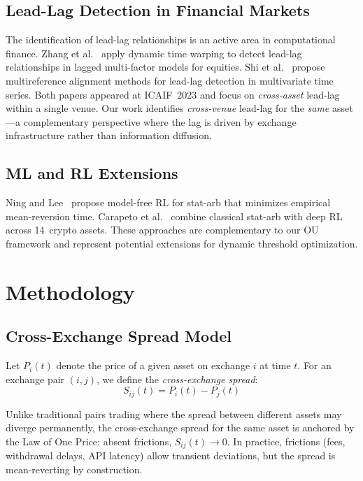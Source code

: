 \documentclass[sigconf,nonacm=false]{acmart}
\begin{document}
\subsection{Lead-Lag Detection in Financial Markets}

The identification of lead-lag relationships is an active area in computational finance. Zhang et al.~\cite{zhang2023dtw} apply dynamic time warping to detect lead-lag relationships in lagged multi-factor models for equities. Shi et al.~\cite{shi2023multireference} propose multireference alignment methods for lead-lag detection in multivariate time series. Both papers appeared at ICAIF~2023 and focus on \emph{cross-asset} lead-lag within a single venue. Our work identifies \emph{cross-venue} lead-lag for the \emph{same} asset---a complementary perspective where the lag is driven by exchange infrastructure rather than information diffusion.

\subsection{ML and RL Extensions}

Ning and Lee~\cite{ning2024advanced} propose model-free RL for stat-arb that minimizes empirical mean-reversion time. Carapeto et al.~\cite{carapeto2024deep} combine classical stat-arb with deep RL across 14~crypto assets. These approaches are complementary to our OU framework and represent potential extensions for dynamic threshold optimization.

\section{Methodology}\label{sec:method}

\subsection{Cross-Exchange Spread Model}

Let $P_i(t)$ denote the price of a given asset on exchange $i$ at time $t$. For an exchange pair $(i, j)$, we define the \emph{cross-exchange spread}:
\begin{equation}
    S_{ij}(t) = P_i(t) - P_j(t)
\end{equation}

Unlike traditional pairs trading where the spread between different assets may diverge permanently, the cross-exchange spread for the same asset is anchored by the Law of One Price: absent frictions, $S_{ij}(t) \to 0$. In practice, frictions (fees, withdrawal delays, API latency) allow transient deviations, but the spread is mean-reverting by construction.
\end{document}
